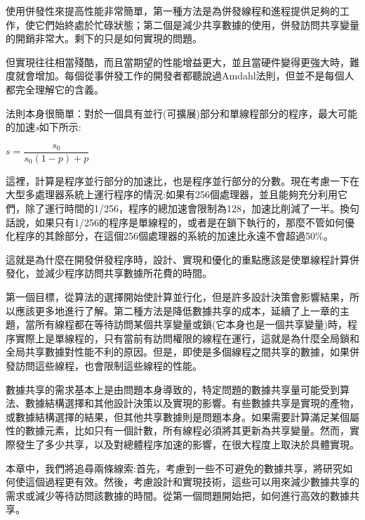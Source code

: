 使用併發性來提高性能非常簡單，第一種方法是為併發線程和進程提供足夠的工作，使它們始終處於忙碌狀態；第二個是減少共享數據的使用，併發訪問共享變量的開銷非常大。剩下的只是如何實現的問題。

但實現往往相當殘酷，而且當期望的性能增益更大，並且當硬件變得更強大時，難度就會增加。每個從事併發工作的開發者都聽說過Amdahl法則，但並不是每個人都完全理解它的含義。

法則本身很簡單：對於一個具有並行(可擴展)部分和單線程部分的程序，最大可能的加速\textit{s}如下所示:

\begin{center}
$ s = \dfrac{s_0}{s_0(1-p)+p} $
\end{center}

這裡，計算是程序並行部分的加速比，也是程序並行部分的分數。現在考慮一下在大型多處理器系統上運行程序的情況:如果有256個處理器，並且能夠充分利用它們，除了運行時間的1/256，程序的總加速會限制為128，加速比削減了一半。換句話說，如果只有1/256的程序是單線程的，或者是在鎖下執行的，那麼不管如何優化程序的其餘部分，在這個256個處理器的系統的加速比永遠不會超過50\%。

這就是為什麼在開發併發程序時，設計、實現和優化的重點應該是使單線程計算併發化，並減少程序訪問共享數據所花費的時間。

第一個目標，從算法的選擇開始使計算並行化，但是許多設計決策會影響結果，所以應該更多地進行了解。第二種方法是降低數據共享的成本，延續了上一章的主題，當所有線程都在等待訪問某個共享變量或鎖(它本身也是一個共享變量)時，程序實際上是單線程的，只有當前有訪問權限的線程在運行，這就是為什麼全局鎖和全局共享數據對性能不利的原因。但是，即使是多個線程之間共享的數據，如果併發訪問這些線程，也會限制這些線程的性能。

數據共享的需求基本上是由問題本身導致的，特定問題的數據共享量可能受到算法、數據結構選擇和其他設計決策以及實現的影響。有些數據共享是實現的產物，或數據結構選擇的結果，但其他共享數據則是問題本身。如果需要計算滿足某個屬性的數據元素，比如只有一個計數，所有線程必須將其更新為共享變量。然而，實際發生了多少共享，以及對總體程序加速的影響，在很大程度上取決於具體實現。

本章中，我們將追尋兩條線索:首先，考慮到一些不可避免的數據共享，將研究如何使這個過程更有效。然後，考慮設計和實現技術，這些可以用來減少數據共享的需求或減少等待訪問該數據的時間。從第一個問題開始把，如何進行高效的數據共享。
































